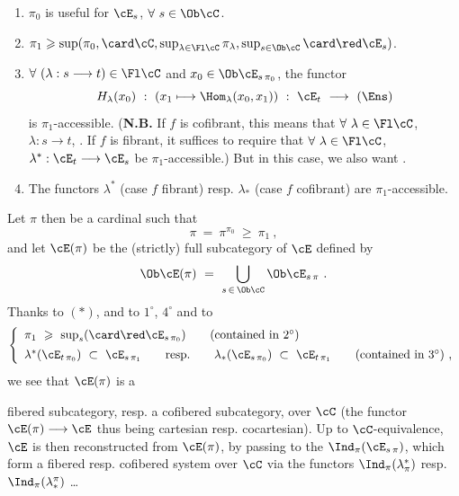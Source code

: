 \begin{enumerate}
\item[\circled{1\textsuperscript{o}}] $\pi_0$ is useful for $\cE_s$, $\forall \ s \in \Ob \cC$.
\item[$2^{\circ}$)] $\pi_1 \geqslant \sup(\pi_0, \card \cC, \sup_{\lambda \in \Fl \cC} \pi_{\lambda}, \sup_{s \in \Ob \cC} \card \red \cE_s)$.
\item[\circled{3\textsuperscript{o}}] $\forall \ (\lambda : s \longrightarrow t) \in \Fl \cC$ and $x_0 \in \Ob \cE_{s\,\pi_0}$, the functor
\[
H_{\lambda}(x_0) \ : \ (x_1 \longmapsto \Hom_{\lambda}(x_0, x_1)) \ : \ \cE_t \ \longrightarrow \ (\Ens)
\]
is $\pi_1$-accessible. (\textbf{N.B.} If $f$ is cofibrant, this means that $\forall \ \lambda \in \Fl \cC$, $\lambda : s \longrightarrow t$,
. If $f$ is fibrant, it suffices to require that $\forall \ \lambda \in \Fl \cC$, $\lambda^* : \cE_t \longrightarrow \cE_s$ %
be $\pi_1$-accessible.) But in this case, we also want . %
\item[\circled{4\textsuperscript{o}}] The functors $\lambda^*$ (case $f$ fibrant) resp. $\lambda_*$ (case $f$ cofibrant) are $\pi_1$-accessible.
\end{enumerate}
Let $\pi$ then be a cardinal such that
\[
\pi \ = \ \pi^{\pi_0} \ \geqslant \ \pi_1 \ , \tag*{$(*)$}
\]
and let $\cE(\pi)$ be the (strictly) full subcategory of $\cE$ defined by
\[
\Ob \cE(\pi) \ = \ \bigcup_{s \, \in \, \Ob \cC} \Ob \cE_{s\,\pi} \ .
\]
Thanks to $(*)$, and to $1^{\circ}$, $4^{\circ}$ and to
\[
\left\{
\begin{array}{l}
\pi_1 \ \geqslant \ \sup_s(\card \red \cE_{s\,\pi_0}) \qquad \text{(contained in $2^{\circ}$)} \\[1ex]
\lambda^*(\cE_{t\,\pi_0}) \ \subset \ \cE_{s\,\pi_1} \qquad \text{resp.} \qquad \lambda_*(\cE_{s\,\pi_0}) \ \subset \ \cE_{t\,\pi_1} \qquad \text{(contained in $3^{\circ}$)} \ ,
\end{array}
\right.
\]
we see that $\cE(\pi)$ is a

fibered subcategory, resp. a cofibered subcategory, over $\cC$ (the functor $\cE(\pi) \longrightarrow \cE$ thus being cartesian resp. cocartesian). Up to $\cC$-equivalence, $\cE$ is then reconstructed from $\cE(\pi)$, by passing to the $\Ind_{\pi}(\cE_{s\,\pi})$, which form a fibered resp. cofibered system over $\cC$ via the functors $\Ind_{\pi}(\lambda^*_{\pi})$ resp. $\Ind_{\pi}(\lambda^{\pi}_*)$ \dots

